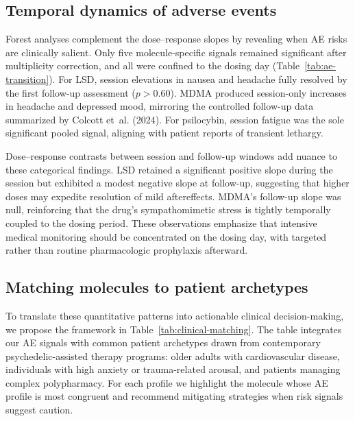 \subsection{Temporal dynamics of adverse events}

Forest analyses complement the dose--response slopes by revealing when AE risks are clinically salient.
Only five molecule-specific signals remained significant after multiplicity correction, and all were confined to the dosing day (Table~\ref{tab:ae-transition}).
For LSD, session elevations in nausea and headache fully resolved by the first follow-up assessment ($p>0.60$).
MDMA produced session-only increases in headache and depressed mood, mirroring the controlled follow-up data summarized by Colcott et~al. (2024).
For psilocybin, session fatigue was the sole significant pooled signal, aligning with patient reports of transient lethargy.

Dose--response contrasts between session and follow-up windows add nuance to these categorical findings.
LSD retained a significant positive slope during the session but exhibited a modest negative slope at follow-up, suggesting that higher doses may expedite resolution of mild aftereffects.
MDMA’s follow-up slope was null, reinforcing that the drug’s sympathomimetic stress is tightly temporally coupled to the dosing period.
These observations emphasize that intensive medical monitoring should be concentrated on the dosing day, with targeted rather than routine pharmacologic prophylaxis afterward.

\subsection{Matching molecules to patient archetypes}

To translate these quantitative patterns into actionable clinical decision-making, we propose the framework in Table~\ref{tab:clinical-matching}.
The table integrates our AE signals with common patient archetypes drawn from contemporary psychedelic-assisted therapy programs: older adults with cardiovascular disease, individuals with high anxiety or trauma-related arousal, and patients managing complex polypharmacy.
For each profile we highlight the molecule whose AE profile is most congruent and recommend mitigating strategies when risk signals suggest caution.

